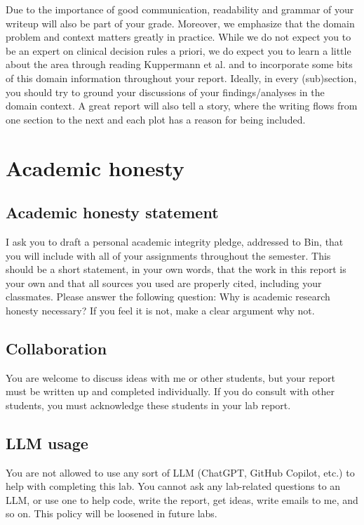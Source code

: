 \documentclass[10pt,letterpaper]{article}
\begin{document}
Due to the importance of good communication, readability and grammar of your writeup will also be part of your grade. Moreover, we emphasize that the domain problem and context matters greatly in practice. While we do not expect you to be an expert on clinical decision rules a priori, we do expect you to learn a little about the area through reading Kuppermann et al. and to incorporate some bits of this domain information throughout your report. Ideally, in every (sub)section, you should try to ground your discussions of your findings/analyses in the domain context. A great report will also tell a story, where the writing flows from one section to the next and each plot has a reason for being included.

\section*{Academic honesty}

\subsection*{Academic honesty statement}

I ask you to draft a personal academic integrity pledge, addressed to Bin, that you will include with all of your assignments throughout the semester. This should be a short statement, in your own words, that the work in this report is your own and that all sources you used are properly cited, including your classmates. Please answer the following question: Why is academic research honesty necessary? If you feel it is not, make a clear argument why not.

\subsection*{Collaboration}

You are welcome to discuss ideas with me or other students, but your report must be written up and completed individually. If you do consult with other students, you must acknowledge these students in your lab report.

\subsection*{LLM usage}

You are not allowed to use any sort of LLM (ChatGPT, GitHub Copilot, etc.) to help with completing this lab. You cannot ask any lab-related questions to an LLM, or use one to help code, write the report, get ideas, write emails to me, and so on. This policy will be loosened in future labs.
\end{document}
